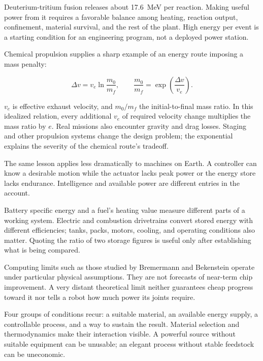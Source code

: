 Deuterium-tritium fusion releases about 17.6~MeV per reaction. Making useful power from it requires a favorable balance among heating, reaction output, confinement, material survival, and the rest of the plant.\cite{atzeni2004physics} High energy per event is a starting condition for an engineering program, not a deployed power station.


Chemical propulsion supplies a sharp example of an energy route imposing a mass penalty:

\begin{equation}
\Delta v=v_e\ln\frac{m_0}{m_f},
\qquad
\frac{m_0}{m_f}=\exp\left(\frac{\Delta v}{v_e}\right).
\end{equation}

$v_e$ is effective exhaust velocity, and $m_0/m_f$ the initial-to-final mass ratio. In this idealized relation, every additional $v_e$ of required velocity change multiplies the mass ratio by $e$. Real missions also encounter gravity and drag losses. Staging and other propulsion systems change the design problem; the exponential explains the severity of the chemical route's tradeoff.

The same lesson applies less dramatically to machines on Earth. A controller can know a desirable motion while the actuator lacks peak power or the energy store lacks endurance. Intelligence and available power are different entries in the account.


Battery specific energy and a fuel's heating value measure different parts of a working system. Electric and combustion drivetrains convert stored energy with different efficiencies; tanks, packs, motors, cooling, and operating conditions also matter.\cite{placke2017lithium,ziegler2021reexamining} Quoting the ratio of two storage figures is useful only after establishing what is being compared.

Computing limits such as those studied by Bremermann and Bekenstein operate under particular physical assumptions.\cite{bremermann1982minimum,bekenstein1981universal} They are not forecasts of near-term chip improvement. A very distant theoretical limit neither guarantees cheap progress toward it nor tells a robot how much power its joints require.

Four groups of conditions recur: a suitable material, an available energy supply, a controllable process, and a way to sustain the result. Material selection and thermodynamics make their interaction visible.\cite{callen1985thermodynamics,georgescu1971entropy} A powerful source without suitable equipment can be unusable; an elegant process without stable feedstock can be uneconomic.

